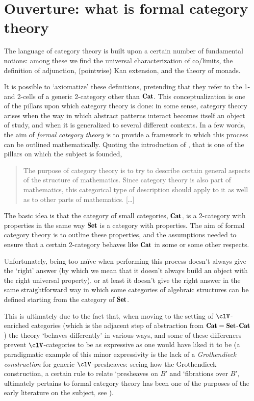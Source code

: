 \section{Ouverture: what is formal category theory} The language of category
theory is built upon a certain number of fundamental notions: among these we
find the universal characterization of co/limits, the definition of adjunction,
(pointwise) Kan extension, and the theory of monads.

It is possible to `axiomatize' these definitions, pretending that they
refer to the 1- and 2-cells of a generic 2-category other than $\Cat$. This
conceptualization is one of the pillars upon which category theory is done: in
some sense, category theory arises when the way in which abstract patterns
interact becomes itself an object of study, and when it is generalized to
several different contexts. In a few words, the aim
of \emph{formal category theory} is to provide a framework in which this process
can be outlined mathematically. Quoting the introduction of \cite{Gray}, that is 
one of the pillars on which the subject is founded,
\begin{quotation} The purpose of category theory is to try to describe certain
general aspects of the structure of mathematics. Since category theory is also
part of mathematics, this categorical type of description should apply to it as
well as to other parts of mathematics. [\dots\unkern]
\end{quotation} The basic idea is that the category of small categories, $\Cat$,
is a 2-category with properties in the same way $\Set$ is a category with properties. 
The aim of formal category theory is to outline these properties, and the assumptions
needed to ensure that a certain 2-category behaves like $\Cat$ in some or some other respects.

Unfortunately, being too na\"ive when performing this process doesn't always
give the `right' answer (by which we mean that it doesn't always build an object
with the right universal property), or at least it doesn't give the right answer in the same
straightforward way in which some categories of algebraic structures can be defined starting
from the category of $\Sets$.

This is ultimately due to the fact that, when moving to the setting of
$\clV$-enriched categories (which is the adjacent step of abstraction from
$\Cat =\Set$-$\Cat$) the theory `behaves differently' in various ways, and some of these
differences prevent $\clV$-categories to be as expressive as one would have
liked it to be (a paradigmatic example of this minor expressivity is the lack of
a \emph{Grothendieck construction} for generic $\clV$-presheaves: seeing how the
Grothendieck construction, a certain rule to relate `presheaves on $B$' and
`fibrations over $B$', ultimately pertains to formal category theory has been
one of the purposes of the early literature on the subject, see
\cite{StreetFibreYoneda1974,street1978yoneda,street1980fibrations}).

